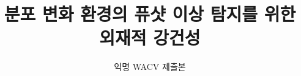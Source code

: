 \documentclass[10pt,twocolumn,letterpaper]{article}
\title{분포 변화 환경의 퓨샷 이상 탐지를 위한 외재적 강건성}
\author{익명 WACV 제출본}
\begin{document}
\maketitle




{
    \small
    
    
}
\end{document}
